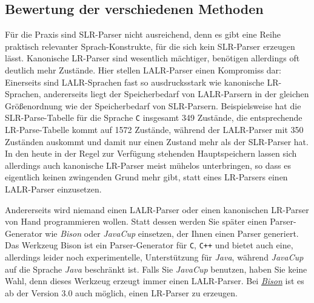 \subsection{Bewertung der verschiedenen Methoden}
F\"ur die Praxis sind SLR-Parser nicht ausreichend, denn es gibt eine Reihe praktisch
relevanter Sprach-Konstrukte, f\"ur die sich kein SLR-Parser erzeugen l\"asst.  Kanonische
LR-Parser sind wesentlich m\"achtiger, ben\"otigen allerdings oft deutlich mehr Zust\"ande. 
Hier stellen LALR-Parser einen Kompromiss dar:  Einerseits sind LALR-Sprachen fast so
ausdrucksstark  wie kanonische LR-Sprachen, andererseits liegt der Speicherbedarf von
LALR-Parsern in der gleichen Gr\"o{\ss}enordnung wie der Speicherbedarf von SLR-Parsern.  Beispielsweise
hat die SLR-Parse-Tabelle f\"ur die Sprache \texttt{C} insgesamt 349 Zust\"ande, die entsprechende
LR-Parse-Tabelle kommt auf 1572 Zust\"ande, w\"ahrend der LALR-Parser mit 350 Zust\"anden auskommt und damit nur
einen Zustand mehr als der SLR-Parser hat.  
In den heute in der Regel zur Verf\"ugung stehenden Hauptspeichern lassen sich allerdings
auch kanonische LR-Parser meist m\"uhelos unterbringen, so dass es eigentlich keinen zwingenden
Grund mehr gibt, statt eines LR-Parsers einen LALR-Parser einzusetzen.  

Andererseits wird niemand einen LALR-Parser oder einen kanonischen LR-Parser von Hand
programmieren wollen.  Statt dessen werden Sie sp\"ater einen Parser-Generator wie \textsl{Bison}
oder \textsl{JavaCup} einsetzen, der Ihnen einen  Parser generiert.  Das Werkzeug Bison
ist ein Parser-Generator f\"ur \texttt{C}, \texttt{C++} und bietet auch eine, allerdings leider noch
experimentelle, Unterst\"utzung f\"ur \textsl{Java},
w\"ahrend \textsl{JavaCup} auf die Sprache \textsl{Java} beschr\"ankt ist.  Falls Sie
\textsl{JavaCup} benutzen, haben Sie keine Wahl, denn dieses Werkzeug erzeugt immer einen
LALR-Parser.  Bei \href{http://www.gnu.org/software/bison/manual/bison.html}{\textsl{Bison}} ist es
ab der Version 3.0  auch m\"oglich, einen LR-Parser zu erzeugen.



